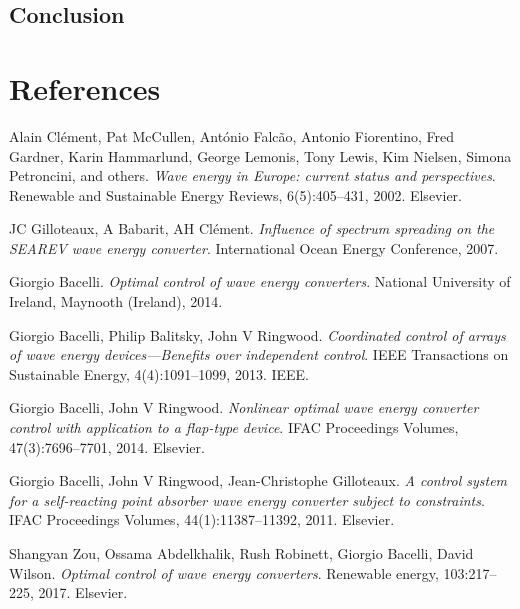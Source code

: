 \documentclass{article}
\begin{document}

\subsection*{\fontsize{12}{14} Conclusion}

\clearpage


\section*{References}

\begin{thebibliography}{99} %

Alain Clément, Pat McCullen, António Falcão, Antonio Fiorentino, Fred Gardner, Karin Hammarlund, George Lemonis, Tony Lewis, Kim Nielsen, Simona Petroncini, and others.
\textit{Wave energy in Europe: current status and perspectives}.
Renewable and Sustainable Energy Reviews, 6(5):405--431, 2002.
Elsevier.

JC Gilloteaux, A Babarit, AH Clément.
\textit{Influence of spectrum spreading on the SEAREV wave energy converter}.
International Ocean Energy Conference, 2007.

Giorgio Bacelli.
\textit{Optimal control of wave energy converters}.
National University of Ireland, Maynooth (Ireland), 2014.

Giorgio Bacelli, Philip Balitsky, John V Ringwood.
\textit{Coordinated control of arrays of wave energy devices—Benefits over independent control}.
IEEE Transactions on Sustainable Energy, 4(4):1091--1099, 2013.
IEEE.

Giorgio Bacelli, John V Ringwood.
\textit{Nonlinear optimal wave energy converter control with application to a flap-type device}.
IFAC Proceedings Volumes, 47(3):7696--7701, 2014.
Elsevier.

Giorgio Bacelli, John V Ringwood, Jean-Christophe Gilloteaux.
\textit{A control system for a self-reacting point absorber wave energy converter subject to constraints}.
IFAC Proceedings Volumes, 44(1):11387--11392, 2011.
Elsevier.

Shangyan Zou, Ossama Abdelkhalik, Rush Robinett, Giorgio Bacelli, David Wilson.
\textit{Optimal control of wave energy converters}.
Renewable energy, 103:217--225, 2017.
Elsevier.


\end{thebibliography}
\end{document}
